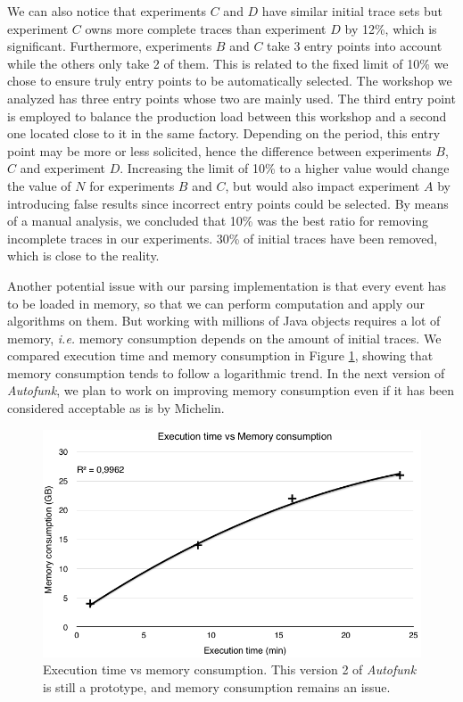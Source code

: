 We can also notice that experiments $C$ and $D$ have similar
initial trace sets but experiment $C$ owns more complete traces
than experiment $D$ by 12\%, which is significant. Furthermore, experiments
$B$ and $C$ take 3 entry points into account while the others only
take 2 of them. This is related to the fixed limit of 10\% we
chose to ensure truly entry points to be automatically selected.
The workshop we analyzed has three entry points whose two are
mainly used. The third entry point is employed to balance the
production load between this workshop and a second one located
close to it in the same factory. Depending on the period, this
entry point may be more or less solicited, hence the
difference between experiments $B$, $C$ and experiment $D$.
Increasing the limit of 10\% to a higher value would change the value
of $N$ for experiments $B$ and $C$, but would also impact
experiment $A$ by introducing false results since incorrect entry
points could be selected. By means of a manual analysis, we
concluded that 10\% was the best ratio for removing incomplete
traces in our experiments.  30\% of initial traces have been
removed, which is close to the reality.

Another potential issue with our parsing implementation is that
every event has to be loaded in memory, so that we can perform
computation and apply our algorithms on them. But working
with millions of Java objects requires a lot of memory, \emph{i.e.}
memory consumption depends on the amount of initial traces. We
compared execution time and memory consumption in Figure
\ref{fig:memory-time}, showing that memory consumption tends to
follow a logarithmic trend. In the next version of
\textit{Autofunk}, we plan to work on improving memory
consumption even if it has been considered acceptable as is by
Michelin.

\begin{figure}[ht]
  \includegraphics[width=1.0\linewidth]{figures/memory-time.png}

  \caption{Execution time vs memory consumption. This version 2 of
  \textit{Autofunk} is still a prototype, and memory consumption
  remains an issue.}
  \label{fig:memory-time}
\end{figure}


